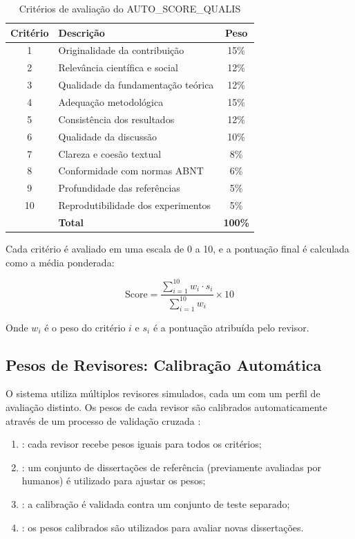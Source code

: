 \begin{table}[htb]
\centering
\caption{Critérios de avaliação do AUTO\_SCORE\_QUALIS}
\label{tab:criterios-qualis}
\begin{tabular}{clc}
\toprule
\textbf{Critério} & \textbf{Descrição} & \textbf{Peso} \\
\midrule
1 & Originalidade da contribuição & 15\% \\
2 & Relevância científica e social & 12\% \\
3 & Qualidade da fundamentação teórica & 12\% \\
4 & Adequação metodológica & 15\% \\
5 & Consistência dos resultados & 12\% \\
6 & Qualidade da discussão & 10\% \\
7 & Clareza e coesão textual & 8\% \\
8 & Conformidade com normas ABNT & 6\% \\
9 & Profundidade das referências & 5\% \\
10 & Reprodutibilidade dos experimentos & 5\% \\
\midrule
& \textbf{Total} & \textbf{100\%} \\
\bottomrule
\end{tabular}
\end{table}

Cada critério é avaliado em uma escala de 0 a 10, e a pontuação final é
calculada como a média ponderada:

\begin{equation}
\text{Score} = \frac{\sum_{i=1}^{10} w_i \cdot s_i}{\sum_{i=1}^{10} w_i} \times 10
\end{equation}

Onde $w_i$ é o peso do critério $i$ e $s_i$ é a pontuação atribuída pelo
revisor.

\subsection{Pesos de Revisores: Calibração Automática}

O sistema utiliza múltiplos revisores simulados, cada um com um perfil de
avaliação distinto. Os pesos de cada revisor são calibrados automaticamente
através de um processo de validação cruzada \cite{hastie2009elements}:

\begin{enumerate}
\item {}: cada revisor recebe pesos iguais para todos
      os critérios;
\item {}: um conjunto de dissertações de referência
      (previamente avaliadas por humanos) é utilizado para ajustar os pesos;
\item {}: a calibração é validada contra um conjunto de
      teste separado;
\item {}: os pesos calibrados são utilizados para avaliar
      novas dissertações.
\end{enumerate}

